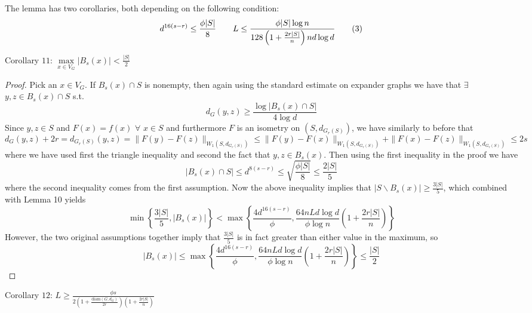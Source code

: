\noindent The lemma has two corollaries, both depending on the following condition:
$$d^{16(s-r)}\le\frac{\phi|S|}{8}\qquad L\le\frac{\phi|S|\log n}{128\left(1+\frac{2r|S|}{n}\right)nd\log d}\qquad(3)$$
\begin{cor} Corollary $11$: $\max\limits_{x\in V_G}|B_s(x)|<\frac{|S|}{2}$
\end{cor}
\begin{proof}
Pick an $x\in V_G$. If $B_s(x)\cap S$ is nonempty, then again using the standard estimate on expander graphs we have that $\exists$ $y,z\in B_s(x)\cap S$ s.t.
$$d_G(y,z)\ge\frac{\log|B_s(x)\cap S|}{4\log d}$$
Since $y,z\in S$ and $F(x)=f(x)$ $\forall$ $x\in S$ and furthermore $F$ is an isometry on $(S,d_{G_r(S)})$, we have similarly to before that
$$d_G(y,z)+2r=d_{G_r(S)}(y,z)=\|F(y)-F(z)\|_{W_1(S,d_{G_r(S)})}\le\|F(y)-F(x)\|_{W_1(S,d_{G_r(S)})}+\|F(x)-F(z)\|_{W_1(S,d_{G_r(S)})}\le 2s$$
where we have used first the triangle inequality and second the fact that $y,z\in B_s(x)$. Then using the first inequality in the proof we have
$$|B_s(x)\cap S|\le d^{8(s-r)}\le\sqrt{\frac{\phi|S|}{8}}\le\frac{2|S|}{5}$$
where the second inequality comes from the first assumption. Now the above inequality implies that $|S\backslash B_s(x)|\ge\frac{3|S|}{5}$, which combined with Lemma 10 yields
$$\min\left\{\frac{3|S|}{5},|B_s(x)|\right\}<\max\left\{\frac{4d^{16(s-r)}}{\phi},\frac{64nLd\log d}{\phi\log n}\left(1+\frac{2r|S|}{n}\right)\right\}$$
However, the two original assumptions together imply that $\frac{3|S|}{5}$ is in fact greater than either value in the maximum, so
$$|B_s(x)|\le\max\left\{\frac{4d^{16(s-r)}}{\phi},\frac{64nLd\log d}{\phi\log n}\left(1+\frac{2r|S|}{n}\right)\right\}\le\frac{|S|}{2}$$
\end{proof}
\begin{cor} Corollary $12$: $L\ge\frac{\phi s}{2\left(1+\frac{\textrm{diam}(G,d_G)}{2r}\right)\left(1+\frac{2r|S|}{n}\right)}$
\end{cor}

